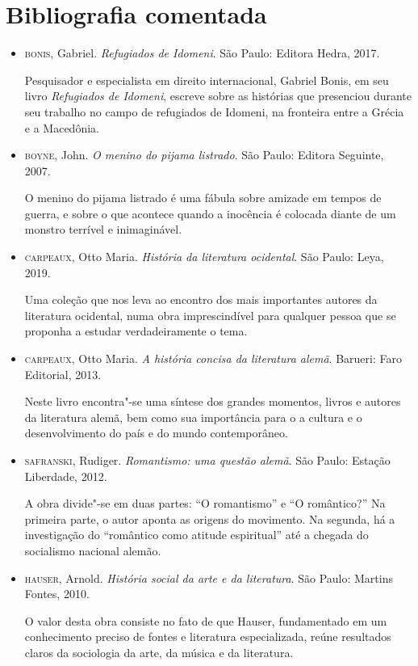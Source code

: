 \documentclass[12pt]{extarticle}
\begin{document}
\section{Bibliografia comentada}

\begin{itemize}
\item \textsc{bonis}, Gabriel. \textit{Refugiados de Idomeni}. São Paulo: Editora Hedra, 2017.

Pesquisador e especialista em direito internacional, Gabriel Bonis, 
em seu livro \textit{Refugiados de Idomeni}, escreve sobre as histórias 
que presenciou durante seu trabalho no campo de refugiados de Idomeni, 
na fronteira entre a Grécia e a Macedônia. 

\item\textsc{boyne}, John. \textit{O menino do pijama listrado}. São Paulo: Editora
Seguinte, 2007.

O menino do pijama listrado é uma fábula sobre amizade em tempos de
guerra, e sobre o que acontece quando a inocência é colocada diante de
um monstro terrível e inimaginável.

\item\textsc{carpeaux}, Otto Maria. \textit{História da literatura ocidental}. São
Paulo: Leya, 2019.

Uma coleção que nos leva ao encontro dos mais importantes autores da
literatura ocidental, numa obra imprescindível para qualquer pessoa que
se proponha a estudar verdadeiramente o tema.

\item\textsc{carpeaux}, Otto Maria. \textit{A história concisa da literatura alemã}.
Barueri: Faro Editorial, 2013.

Neste livro encontra"-se uma síntese dos grandes momentos, livros e
autores da literatura alemã, bem como sua importância para o a cultura e
o desenvolvimento do país e do mundo contemporâneo.

\item\textsc{safranski}, Rudiger. \textit{Romantismo: uma questão alemã}. São
Paulo: Estação Liberdade, 2012.

A obra divide"-se em duas partes: ``O romantismo'' e ``O romântico?'' Na
primeira parte, o autor aponta as origens do movimento. Na segunda, há a
investigação do ``romântico como atitude espiritual'' até a chegada do
socialismo nacional alemão.

\item\textsc{hauser}, Arnold. \textit{História social da arte e da literatura}. São
Paulo: Martins Fontes, 2010.

O valor desta obra consiste no fato de que Hauser, fundamentado em um
conhecimento preciso de fontes e literatura especializada, reúne
resultados claros da sociologia da arte, da música e da literatura.
\end{itemize}
\end{document}
